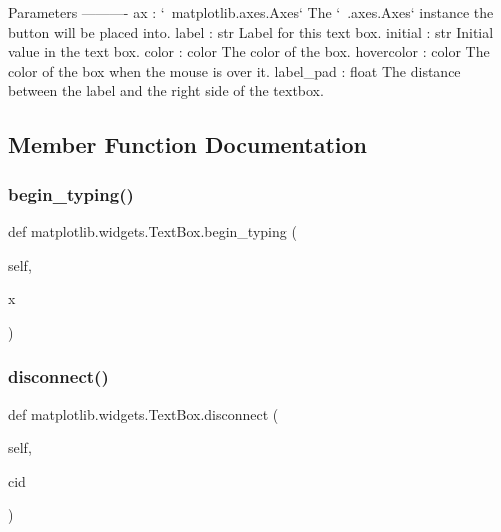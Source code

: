\begin{DoxyVerb}Parameters
----------
ax : `~matplotlib.axes.Axes`
    The `~.axes.Axes` instance the button will be placed into.
label : str
    Label for this text box.
initial : str
    Initial value in the text box.
color : color
    The color of the box.
hovercolor : color
    The color of the box when the mouse is over it.
label_pad : float
    The distance between the label and the right side of the textbox.
\end{DoxyVerb}
 

\subsection{Member Function Documentation}
\mbox{\label{classmatplotlib_1_1widgets_1_1TextBox_ab6797a0cb90afe38c8b3d4e79d1a70e8}} 
\subsubsection{\texorpdfstring{begin\+\_\+typing()}{begin\_typing()}}
{\footnotesize\ttfamily def matplotlib.\+widgets.\+Text\+Box.\+begin\+\_\+typing (\begin{DoxyParamCaption}\item[{}]{self,  }\item[{}]{x }\end{DoxyParamCaption})}

\mbox{\label{classmatplotlib_1_1widgets_1_1TextBox_ac53445dd12b77ff01b0da70be22a7cf0}} 
\subsubsection{\texorpdfstring{disconnect()}{disconnect()}}
{\footnotesize\ttfamily def matplotlib.\+widgets.\+Text\+Box.\+disconnect (\begin{DoxyParamCaption}\item[{}]{self,  }\item[{}]{cid }\end{DoxyParamCaption})}


